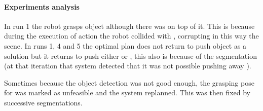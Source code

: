 \paragraph{Experiments analysis}
In run 1 the robot grasps object  although there was  on top of it. This is because during the execution of   action the robot collided with , corrupting in this way the scene.  In runs 1, 4 and 5 the optimal plan does not return to push object  as a solution but it returns to push either  or , this also is because of the segmentation (at that iteration that system detected that it was not possible pushing away ). 

Sometimes because the object detection was not good enough, the grasping pose for  was marked as unfeasible and the system replanned. This was then fixed by successive segmentations.

